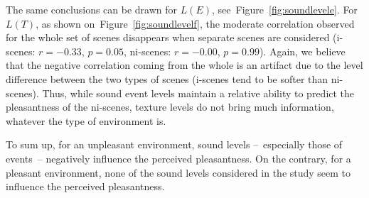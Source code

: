 \documentclass[12pt]{elsarticle}
\newcommand{\ie}{\emph{i.\,e.}}
\newcommand{\cf}{cf.}
\begin{document}

The same conclusions can be drawn for $L(E)$, see~Figure~\ref{fig:soundlevele}. For $L(T)$, as shown on~Figure~\ref{fig:soundlevelf}, the moderate correlation observed for the whole set of scenes disappears when separate scenes are considered (i-scenes: $r=-0.33$, $p=0.05$, ni-scenes: $r=-0.00$, $p=0.99$). Again, we believe that the negative correlation coming from the whole is an artifact due to the level difference between the two types of scenes (i-scenes tend to be softer than ni-scenes). Thus, while sound event levels maintain a relative ability to predict the pleasantness of the ni-scenes, texture levels do not bring much information, whatever the type of environment is.


To sum up, for an unpleasant environment, sound levels --~especially those of events~-- negatively influence the perceived pleasantness. On the contrary, for a pleasant environment, none of the sound levels considered in the study seem to influence the perceived pleasantness.

%
\end{document}
